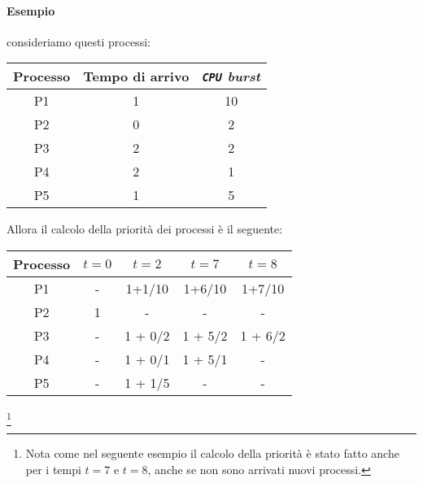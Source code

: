             \paragraph{Esempio} consideriamo questi processi:
            \begin{table}[H]
                \centering
                \begin{tabular}{|c|c|c|}
                    \hline
                    \textbf{Processo} & \textbf{Tempo di arrivo} & \textbf{\textit{\texttt{CPU} burst}} \\ \hline
                    P1 & 1 & 10 \\ \hline
                    P2 & 0 & 2 \\ \hline
                    P3 & 2 & 2 \\ \hline
                    P4 & 2 & 1 \\ \hline
                    P5 & 1 & 5 \\ \hline
                \end{tabular}
            \end{table}
            Allora il calcolo della priorità dei processi è il seguente:
            \begin{table}[H]
                \centering
                \begin{tabular}{|c|c|c|c|c|}
                    \hline 
                    \textbf{Processo} & $t=0$ & $t=2$ & $t=7$ & $t=8$ \\ \hline
                    P1 & - & 1+1/10 & 1+6/10 & 1+7/10 \\ \hline
                    P2 & 1 & - & - & - \\ \hline
                    P3 & - & 1 + 0/2 & 1 + 5/2 & 1 + 6/2 \\ \hline
                    P4 & - & 1 + 0/1 & 1 + 5/1 & - \\ \hline
                    P5 & - & 1 + 1/5 & - & - \\ \hline
                \end{tabular}
            \end{table}\footnote{Nota come nel seguente esempio il calcolo della priorità è stato fatto anche per i tempi $t=7$ e $t=8$, anche se non sono arrivati nuovi processi.}
